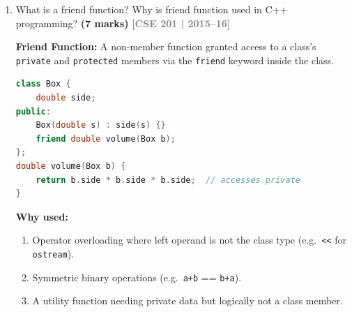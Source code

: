 \documentclass[12pt,a3paper]{article}
\newcommand{\yr}[1]{\hfill\textcolor{gray}{\small\textbf{[#1]}}}
\newcommand{\mk}[1]{\textcolor{orange!70!black}{\small\textbf{(#1 marks)}}}
\begin{document}
\begin{enumerate}
\begin{tcolorbox}
\textbf{(ii) Member of another class as friend:}
\begin{lstlisting}[language=C++]
class Distance;
class Printer {
public:
    void printDistance(Distance& d);
};
class Distance {
    int metres;
public:
    Distance(int m) : metres(m) {}
    friend void Printer::printDistance(Distance&);
};
void Printer::printDistance(Distance& d) {
    cout << d.metres << " m\n";
}
int main() {
    Printer p; Distance d(42);
    p.printDistance(d);   // 42 m
}
\end{lstlisting}

\end{tcolorbox}


\item What is a friend function? Why is friend function used in C++ programming? \mk{7}
\yr{CSE 201 | 2015--16}


\begin{tcolorbox}[enhanced,breakable,ansbox,colback=cD!4,colframe=cD,
  boxrule=0.8pt,arc=5pt,
  title={\textbf{Answer --- Friend function definition and purpose}},
  fonttitle=\bfseries\color{white},colbacktitle=cD]

\textbf{Friend Function:} A non-member function granted access to a
class's \texttt{private} and \texttt{protected} members via the
\texttt{friend} keyword inside the class.

\begin{lstlisting}[language=C++]
class Box {
    double side;
public:
    Box(double s) : side(s) {}
    friend double volume(Box b);
};
double volume(Box b) {
    return b.side * b.side * b.side;  // accesses private
}
\end{lstlisting}

\textbf{Why used:}
\begin{enumerate}[label=\textbf{\arabic*.}]
  \item Operator overloading where left operand is not the class
    type (e.g.\ \texttt{<<} for \texttt{ostream}).
  \item Symmetric binary operations (e.g.\ \texttt{a+b} ==
    \texttt{b+a}).
  \item A utility function needing private data but logically not
    a class member.
\end{enumerate}


\end{tcolorbox}
\end{enumerate}
\end{document}
